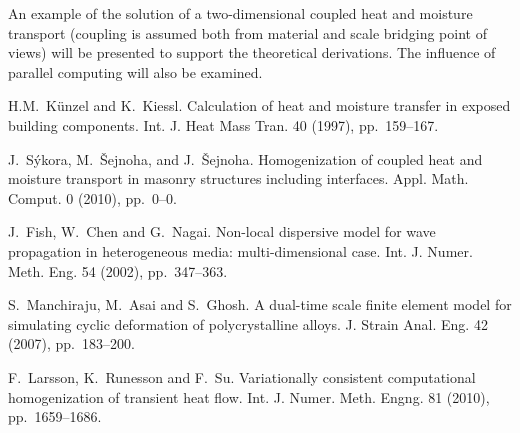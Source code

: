 An example of the solution of a two-dimensional coupled heat and moisture transport (coupling is assumed both from material and scale bridging point of views) will be presented to support the theoretical derivations. The influence of parallel computing will also be examined.


\begin{thebibliography}{10}

{\sc H.M.~K\"{u}nzel and  K.~Kiessl}. {Calculation of heat and
moisture transfer in exposed building components}. Int. J. Heat
Mass Tran. 40 (1997),
  pp.~159--167.

{\sc J.~S\'{y}kora,  M.~\v{S}ejnoha, and J.~\v{S}ejnoha}.
{Homogenization of coupled heat and moisture transport in masonry
structures including interfaces}. Appl. Math. Comput. 0 (2010),
  pp.~0--0.

{\sc J.~Fish, W.~Chen and G.~Nagai}. {Non-local dispersive model
for wave propagation in heterogeneous media: multi-dimensional
case}. Int. J. Numer. Meth. Eng. 54 (2002),
  pp.~347--363.

{\sc S.~Manchiraju, M.~Asai and S.~Ghosh}. {A dual-time scale
finite element model for simulating cyclic deformation of
polycrystalline alloys}. J. Strain Anal. Eng. 42 (2007),
  pp.~183--200.

{\sc F.~Larsson, K.~Runesson and F.~Su}. {Variationally consistent
computational homogenization of transient heat flow}. Int. J.
Numer. Meth. Engng. 81
  (2010), pp.~1659--1686.

\end{thebibliography}